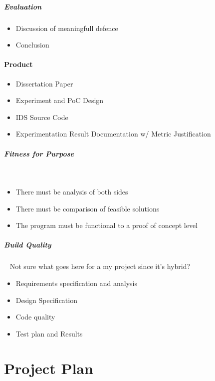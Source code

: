 \subparagraph{Evaluation}
\begin{itemize}
	\item Discussion of meaningfull defence
	\item Conclusion
\end{itemize}

\paragraph{Product}
\begin{itemize}
	\item Dissertation Paper
	\item Experiment and PoC Design
	\item IDS Source Code
	\item Experimentation Result Documentation w/ Metric Justification
\end{itemize}

\subparagraph{Fitness for Purpose}~
\begin{itemize}
	\item There must be analysis of both sides
	\item There must be comparison of feasible solutions
	\item The program must be functional to a proof of concept level
\end{itemize}

\subparagraph{Build Quality}~
Not sure what goes here for a my project since it's hybrid?
\begin{itemize}
	\item Requirements specification and analysis
	\item Design Specification 
	\item Code quality
	\item Test plan and Results
\end{itemize}

\clearpage

\section{Project Plan}
\noindent
{}
